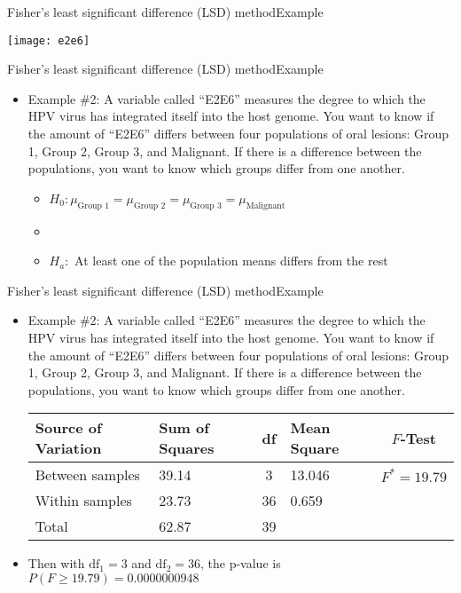 \documentclass[xcolor=dvipsnames]{beamer}
\begin{document}
\begin{frame}{Fisher's least significant difference (LSD) method}{Example}
	\begin{center}
		\texttt{[image: e2e6]}
	\end{center}
\end{frame}

\begin{frame}{Fisher's least significant difference (LSD) method}{Example}
	\begin{itemize}
		\item Example \#2: A variable called ``E2E6'' measures the degree to which the HPV virus has integrated itself into the host genome. You want to know if the amount of ``E2E6'' differs between four populations of oral lesions: Group 1, Group 2, Group 3, and Malignant. If there is a difference between the populations, you want to know which groups differ from one another.
		\begin{itemize}
			\item $H_0: \mu_{\text{Group 1}} = \mu_{\text{Group 2}} = \mu_{\text{Group 3}} = \mu_{\text{Malignant}}$ \pause
			\item[]
			\item $H_a:$ At least one of the population means differs from the rest \pause
		\end{itemize}
	\end{itemize}
\end{frame}  

\begin{frame}{Fisher's least significant difference (LSD) method}{Example}
	\begin{itemize}
		\item Example \#2: A variable called ``E2E6'' measures the degree to which the HPV virus has integrated itself into the host genome. You want to know if the amount of ``E2E6'' differs between four populations of oral lesions: Group 1, Group 2, Group 3, and Malignant. If there is a difference between the populations, you want to know which groups differ from one another.
		\vspace{5mm}
		\begin{center}
			{\scriptsize
				\begin{tabular}{lp{1.2cm}cp{2.5cm}c}
					\hline 
					\textbf{Source of Variation} & \textbf{Sum of Squares} & \textbf{df} & \textbf{Mean Square} & $F$-\textbf{Test} \\ \hline 
					Between samples & 39.14 & 3 & 13.046 & $F^*=19.79$ \\
					Within samples & 23.73 & 36 &  0.659 & \\
					Total & 62.87 & 39 & & \\ \hline
			\end{tabular}}
		\end{center} \pause
		\vspace{5mm}
	\item Then with $\text{df}_1 = 3$ and $\text{df}_2=36$, the p-value is $P(F \geq 19.79) = 0.0000000948$
	\end{itemize}
\end{frame}
\end{document}
